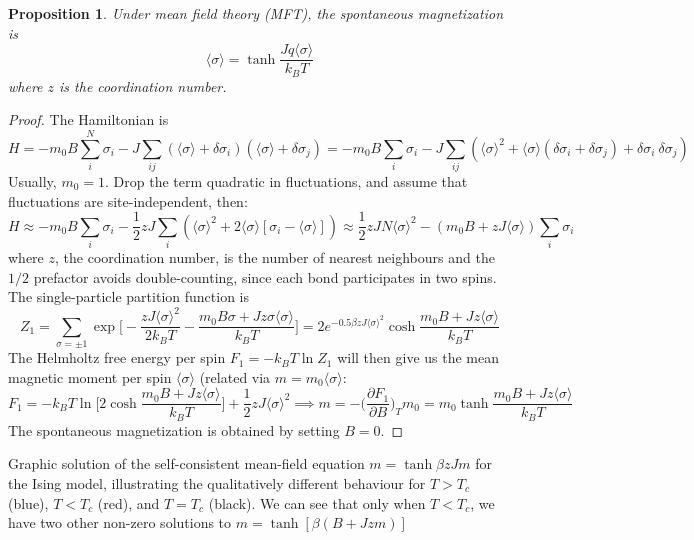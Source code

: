 \documentclass[a4paper]{article}
\theoremstyle{new}
\newtheorem{prop}{Proposition}[section]
\begin{document}
\begin{prop}
Under mean field theory (MFT), the spontaneous magnetization is
$$\langle\sigma\rangle=\tanh\frac{Jq\langle\sigma\rangle}{k_BT}$$
where $z$ is the coordination number.
\end{prop}
\begin{proof}
The Hamiltonian is
$$H=-m_0B\sum_i^N\sigma_i-J\sum_{ij}(\langle\sigma\rangle+\delta\sigma_i)(\langle\sigma\rangle+\delta\sigma_j)=-m_0B\sum_i\sigma_i-J\sum_{ij}(\langle\sigma\rangle^2+\langle\sigma\rangle(\delta\sigma_i+\delta\sigma_j)+\delta\sigma_i~\delta\sigma_j)$$
Usually, $m_0=1$. Drop the term quadratic in fluctuations, and assume that fluctuations are site-independent, then:
$$H\approx-m_0B\sum_i\sigma_i-\frac{1}{2}zJ\sum_i(\langle\sigma\rangle^2+2\langle\sigma\rangle[\sigma_i-\langle\sigma\rangle])\approx\frac{1}{2}zJN\langle\sigma\rangle^2-(m_0B+zJ\langle\sigma\rangle)\sum_i\sigma_i$$
where $z$, the coordination number, is the number of nearest neighbours and the $1/2$ prefactor avoids double-counting, since each bond participates in two spins. The single-particle partition function is
$$Z_1=\sum_{\sigma=\pm1}\exp\bigg[-\frac{zJ\langle\sigma\rangle^2}{2k_BT}-\frac{m_0B\sigma+Jz\sigma\langle\sigma\rangle}{k_BT}\bigg]=2e^{-0.5\beta zJ\langle\sigma\rangle^2}\cosh\frac{m_0B+Jz\langle\sigma\rangle}{k_BT}$$
The Helmholtz free energy per spin $F_1=-k_BT\ln Z_1$ will then give us the mean magnetic moment per spin $\langle\sigma\rangle$ (related via $m=m_0\langle\sigma\rangle$:
$$F_1=-k_BT\ln\bigg[2\cosh\frac{m_0B+Jz\langle\sigma\rangle}{k_BT}\bigg]+\frac{1}{2}zJ\langle\sigma\rangle^2\implies m=-\bigg(\frac{\partial F_1}{\partial B}\bigg)_Tm_0=m_0\tanh\frac{m_0B+Jz\langle\sigma\rangle}{k_BT}$$
The spontaneous magnetization is obtained by setting $B=0$.
\end{proof}
Graphic solution of the self-consistent mean-field equation $m=\tanh\beta zJm$ for the Ising model, illustrating the qualitatively different behaviour for $T > T_c$ (blue), $T < T_c$ (red), and $T = T_c$ (black). We can see that only when $T<T_c$, we have two other non-zero solutions to $m=\tanh[\beta(B+Jzm)]$
\begin{center}
\end{center}
\end{document}
